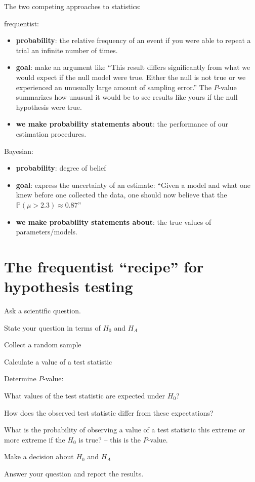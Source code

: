 \documentclass[landscape]{foils}
\renewcommand{\Pr}{\mathbb{P}}
\begin{document}
\myNewSlide
The two competing approaches to statistics:
\begin{compactitem}
  \item frequentist:
  \begin{itemize}
    \item {\bf probability}: the relative frequency of an event if you were able to repeat a trial an infinite number of times.
    \item {\bf goal}: make an argument like ``This result differs significantly from what we would expect if the null model were true. Either the null is not true or we experienced an unusually large amount of sampling error.''
    The $P$-value summarizes how unusual it would be to see results like yours if the null hypothesis were true.
    \item {\bf we make probability statements about}: the performance of our estimation procedures.
  \end{itemize}
  \item Bayesian:
  \begin{itemize}
    \item {\bf probability}: degree of belief
    \item {\bf goal}: express the uncertainty of an estimate:
    ``Given a model and what one knew before one collected the data, one should now believe that the $\Pr(\mu>2.3)\approx 0.87$''
    \item {\bf we make probability statements about}: the true values of parameters/models.
  \end{itemize}
\end{compactitem}

\myNewSlide
\section*{The frequentist ``recipe'' for hypothesis testing}
\begin{compactenum}
  \item Ask a scientific question.
  \item State your question in terms of $H_0$ and $H_A$
  \item Collect a random sample
  \item Calculate a value of a test statistic
  \item Determine $P$-value:
  \begin{compactenum}
    \item What values of the test statistic are expected under $H_0$?
    \item How does the observed test statistic differ from these expectations?
    \item What is the probability of observing a value of a test statistic this extreme or more extreme if the $H_0$ is true? -- this is the $P$-value.
  \end{compactenum}
  \item Make a decision about $H_0$ and $H_A$
  \item Answer your question and report the results.
\end{compactenum}
\end{document}
